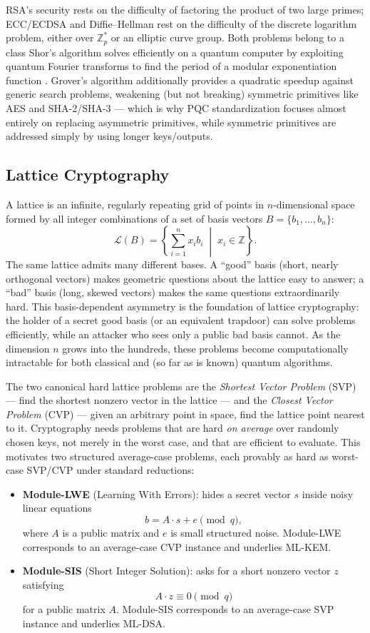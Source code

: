 \documentclass[10pt,conference]{IEEEtran}
\begin{document}
RSA's security rests on the difficulty of factoring the product of two
large primes; ECC/ECDSA and Diffie--Hellman rest on the difficulty of the
discrete logarithm problem, either over $\mathbb{Z}_p^*$ or an elliptic
curve group. Both problems belong to a class Shor's algorithm solves
efficiently on a quantum computer by exploiting quantum Fourier
transforms to find the period of a modular exponentiation function
\cite{shor1997}. Grover's algorithm additionally provides a quadratic
speedup against generic search problems, weakening (but not breaking)
symmetric primitives like AES and SHA-2/SHA-3 --- which is why PQC
standardization focuses almost entirely on replacing asymmetric
primitives, while symmetric primitives are addressed simply by using
longer keys/outputs.

\subsection{Lattice Cryptography}

A lattice is an infinite, regularly repeating grid of points in
$n$-dimensional space formed by all integer combinations of a set of
basis vectors $B = \{b_1, \dots, b_n\}$:
\[
\mathcal{L}(B) = \left\{ \sum_{i=1}^{n} x_i b_i \;\middle|\; x_i \in
\mathbb{Z} \right\}.
\]
The same lattice admits many different bases. A ``good'' basis (short,
nearly orthogonal vectors) makes geometric questions about the lattice
easy to answer; a ``bad'' basis (long, skewed vectors) makes the same
questions extraordinarily hard. This basis-dependent asymmetry is the
foundation of lattice cryptography: the holder of a secret good basis (or
an equivalent trapdoor) can solve problems efficiently, while an attacker
who sees only a public bad basis cannot. As the dimension $n$ grows into
the hundreds, these problems become computationally intractable for both
classical and (so far as is known) quantum algorithms.

The two canonical hard lattice problems are the \emph{Shortest Vector
Problem} (SVP) --- find the shortest nonzero vector in the lattice --- and
the \emph{Closest Vector Problem} (CVP) --- given an arbitrary point in
space, find the lattice point nearest to it. Cryptography needs problems
that are hard \emph{on average} over randomly chosen keys, not merely in
the worst case, and that are efficient to evaluate. This motivates two
structured average-case problems, each provably as hard as worst-case
SVP/CVP under standard reductions:

\begin{itemize}
\item \textbf{Module-LWE} (Learning With Errors): hides a secret vector
  $s$ inside noisy linear equations
  \[
  b = A \cdot s + e \pmod q,
  \]
  where $A$ is a public matrix and $e$ is small structured noise. Module-LWE
  corresponds to an average-case CVP instance and underlies ML-KEM.
\item \textbf{Module-SIS} (Short Integer Solution): asks for a short
  nonzero vector $z$ satisfying
  \[
  A \cdot z \equiv 0 \pmod q
  \]
  for a public matrix $A$. Module-SIS corresponds to an average-case SVP
  instance and underlies ML-DSA.
\end{itemize}
\end{document}
